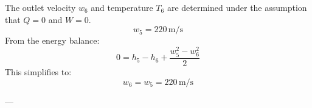The outlet velocity \( w_6 \) and temperature \( T_6 \) are determined under the assumption that \( Q = 0 \) and \( W = 0 \).  
\[
w_5 = 220 \, \text{m/s}
\]  
From the energy balance:  
\[
0 = h_5 - h_6 + \frac{w_5^2 - w_6^2}{2}
\]  
This simplifies to:  
\[
w_6 = w_5 = 220 \, \text{m/s}
\]  

---